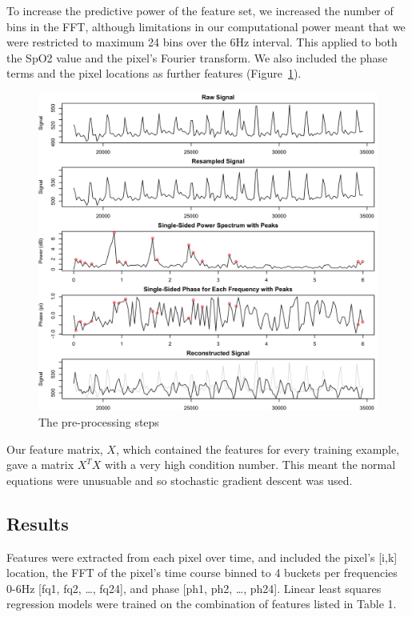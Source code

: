 \documentclass[12pt]{article}
\begin{document}
  To increase the predictive power of the feature set, we increased the number of bins in the FFT, although limitations in our computational power meant that we were restricted to maximum 24 bins over the 6Hz interval. This applied to both the SpO2 value and the pixel's Fourier transform. We also included the phase terms and the pixel locations as further features (Figure~\ref{figure:preprocessing}).

  \begin{figure}[tb]
    \captionsetup{justification=centering}
    \includegraphics[width=\textwidth]{images/fig1.png}
    \caption{The pre-processing steps \label{figure:preprocessing}}
  \end{figure}
  
 Our feature matrix, \(X\), which contained the features for every training example, gave a matrix $X^TX$ with a very high condition number. This meant the normal equations were unusuable and so stochastic gradient descent was used.
 
 \subsection*{Results}
 Features were extracted from each pixel over time, and included the pixel’s [i,k] location, the FFT of the pixel’s time course binned to 4 buckets per frequencies 0-6Hz [fq1, fq2, …, fq24], and phase [ph1, ph2, …, ph24]. Linear least squares regression models were trained on the combination of features listed in Table 1.\\
\end{document}
